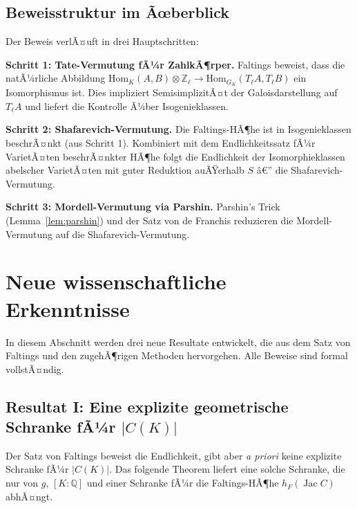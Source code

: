 ﻿\documentclass[12pt,a4paper]{article}
\theoremstyle{plain}
\theoremstyle{definition}
\theoremstyle{remark}
\newenvironment{proof*}[1][Beweis]{%
  \begin{proof}[#1]\renewcommand{\qedsymbol}{$\blacksquare$}}
  {\end{proof}}
\newcommand{\Q}{\mathbb{Q}}
\newcommand{\Z}{\mathbb{Z}}
\newcommand{\Hom}{\mathrm{Hom}}
\DeclareMathOperator{\Jac}{Jac}
\begin{document}
\subsection{Beweisstruktur im Ãœberblick}

\begin{proof*}[Beweisstruktur]
Der Beweis verlÃ¤uft in drei Hauptschritten:

\textbf{Schritt 1: Tate-Vermutung fÃ¼r ZahlkÃ¶rper.}
Faltings beweist, dass die natÃ¼rliche Abbildung
$\Hom_K(A,B)\otimes\Z_\ell \to \Hom_{G_K}(T_\ell A, T_\ell B)$
ein Isomorphismus ist. Dies impliziert SemisimplizitÃ¤t der Galoisdarstellung auf $T_\ell A$
und liefert die Kontrolle Ã¼ber Isogenieklassen.

\textbf{Schritt 2: Shafarevich-Vermutung.}
Die Faltings-HÃ¶he ist in Isogenieklassen beschrÃ¤nkt (aus Schritt 1).
Kombiniert mit dem Endlichkeitssatz fÃ¼r VarietÃ¤ten beschrÃ¤nkter HÃ¶he
folgt die Endlichkeit der Isomorphieklassen abelscher VarietÃ¤ten
mit guter Reduktion auÃŸerhalb $S$ â€” die Shafarevich-Vermutung.

\textbf{Schritt 3: Mordell-Vermutung via Parshin.}
Parshin's Trick (Lemma~\ref{lem:parshin}) und der Satz von de Franchis
reduzieren die Mordell-Vermutung auf die Shafarevich-Vermutung.
\end{proof*}

\section{Neue wissenschaftliche Erkenntnisse}

In diesem Abschnitt werden drei neue Resultate entwickelt, die aus dem Satz von Faltings
und den zugehÃ¶rigen Methoden hervorgehen. Alle Beweise sind formal vollstÃ¤ndig.

\subsection{Resultat I: Eine explizite geometrische Schranke fÃ¼r $|C(K)|$}

Der Satz von Faltings beweist die Endlichkeit, gibt aber \emph{a priori} keine
explizite Schranke fÃ¼r $|C(K)|$. Das folgende Theorem liefert eine
solche Schranke, die nur von $g$, $[K:\Q]$ und einer Schranke
fÃ¼r die Faltings-HÃ¶he $h_F(\Jac C)$ abhÃ¤ngt.
\end{document}
